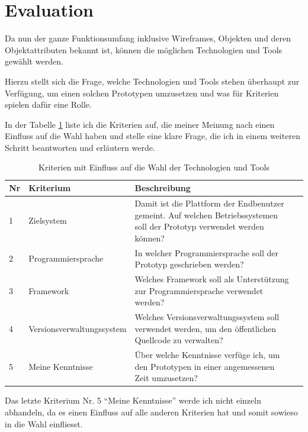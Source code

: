 \section{Evaluation}
Da nun der ganze Funktionsumfang inklusive Wireframes, Objekten und deren
Objektattributen bekannt ist, können die möglichen Technologien und Tools
gewählt werden.

Hierzu stellt sich die Frage, welche Technologien und Tools stehen überhaupt
zur Verfügung, um einen solchen Prototypen umzusetzen und was für Kriterien spielen
dafür eine Rolle.

In der Tabelle \ref{tab:umsetzungskriterien} liste ich die Kriterien auf, die
meiner Meinung nach einen Einfluss auf die Wahl haben und stelle eine klare 
Frage, die ich in einem weiteren Schritt beantworten und erläutern werde.

\begin{table}[h]
\begin{center}
    \begin{tabular}{llp{9cm}l}
        \toprule Nr & Kriterium & Beschreibung \\
        \midrule 1 & Zielsystem & Damit ist die Plattform der Endbenutzer
                 gemeint. Auf welchen Betriebssystemen soll der Prototyp 
                 verwendet werden können? \\
        \midrule 2 & Programmiersprache & In welcher Programmiersprache soll
                 der Prototyp geschrieben werden? \\
        \midrule 3 & Framework & Welches Framework soll als Unterstützung zur
                 Programmiersprache verwendet werden? \\
        \midrule 4 & Versionsverwaltungssystem & Welches Versionsverwaltungssystem soll
                 verwendet werden, um den öffentlichen Quellcode zu verwalten? \\
        \midrule 5 & Meine Kenntnisse & Über welche Kenntnisse verfüge ich, um
                 den Prototypen in einer angemessenen Zeit umzusetzen? \\
        \bottomrule
    \end{tabular}
    \caption{Kriterien mit Einfluss auf die Wahl der Technologien und Tools}
    \label{tab:umsetzungskriterien}
\end{center}
\end{table}

Das letzte Kriterium Nr. 5 ``Meine Kenntnisse'' werde ich nicht einzeln abhandeln,
da es einen Einfluss auf alle anderen Kriterien hat und somit sowieso in die Wahl
einfliesst.

